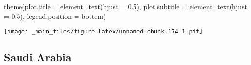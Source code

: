 \documentclass[
]{book}
\newenvironment{Shaded}{\begin{snugshade}}{\end{snugshade}}
\newcommand{\AttributeTok}[1]{\textcolor[rgb]{0.77,0.63,0.00}{#1}}
\newcommand{\FloatTok}[1]{\textcolor[rgb]{0.00,0.00,0.81}{#1}}
\newcommand{\FunctionTok}[1]{\textcolor[rgb]{0.00,0.00,0.00}{#1}}
\newcommand{\NormalTok}[1]{#1}
\newcommand{\StringTok}[1]{\textcolor[rgb]{0.31,0.60,0.02}{#1}}
\begin{document}
\begin{Shaded}
\begin{Highlighting}[]
  \FunctionTok{theme}\NormalTok{(}\AttributeTok{plot.title =} \FunctionTok{element\_text}\NormalTok{(}\AttributeTok{hjust =} \FloatTok{0.5}\NormalTok{),}
        \AttributeTok{plot.subtitle =} \FunctionTok{element\_text}\NormalTok{(}\AttributeTok{hjust =} \FloatTok{0.5}\NormalTok{),}
        \AttributeTok{legend.position =} \StringTok{\textquotesingle{}bottom\textquotesingle{}}\NormalTok{)}
\end{Highlighting}
\end{Shaded}

\texttt{[image: \_main\_files/figure-latex/unnamed-chunk-174-1.pdf]}

\hypertarget{saudi-arabia-1}{%
\subsection{Saudi Arabia}\label{saudi-arabia-1}}
\end{document}
